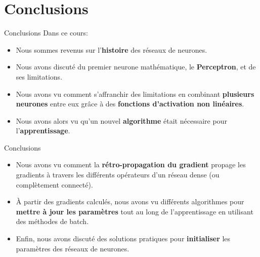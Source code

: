 \section[Conclusions]{Conclusions}

\begin{frame}{Conclusions}
	Dans ce cours:
	\begin{itemize}
		\item Nous sommes revenus sur l'\textbf{histoire} des réseaux de neurones.
		\pause
		\item Nous avons discuté du premier neurone mathématique, le \textbf{Perceptron}, et de ses limitations.
		\pause
		\item Nous avons vu comment s'affranchir des limitations en combinant \textbf{plusieurs neurones} entre eux grâce à des \textbf{fonctions d'activation non linéaires}.
		\pause
		\item Nous avons alors vu qu'un nouvel \textbf{algorithme} était nécessaire pour l'\textbf{apprentissage}.
	\end{itemize}
\end{frame}

\begin{frame}{Conclusions}
	\begin{itemize}
		\item Nous avons vu comment la \textbf{rétro-propagation du gradient} propage les gradients à travers les différents opérateurs d'un réseau dense (ou complètement connecté).
		\pause
		\item \`A partir des gradients calculés, nous avons vu différents algorithmes pour \textbf{mettre à jour les paramètres} tout au long de l'apprentissage en utilisant des méthodes de batch.
		\pause
		\item Enfin, nous avons discuté des solutions pratiques pour \textbf{initialiser} les paramètres des réseaux de neurones.
	\end{itemize}
\end{frame}